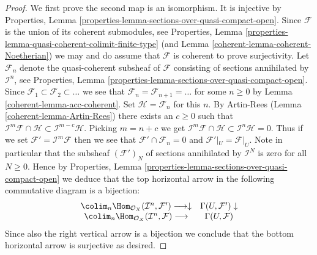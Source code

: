 \begin{proof}

We first prove the second map is an isomorphism. It is injective by
Properties, Lemma \ref{properties-lemma-sections-over-quasi-compact-open}.
Since $\mathcal{F}$ is the union of its coherent submodules, see
Properties, Lemma \ref{properties-lemma-quasi-coherent-colimit-finite-type}
(and Lemma \ref{coherent-lemma-coherent-Noetherian})
we may and do assume that $\mathcal{F}$ is coherent to prove surjectivity.
Let $\mathcal{F}_n$ denote the quasi-coherent subsheaf of $\mathcal{F}$
consisting of sections annihilated by $\mathcal{I}^n$,
see Properties, Lemma \ref{properties-lemma-sections-over-quasi-compact-open}.
Since $\mathcal{F}_1 \subset \mathcal{F}_2 \subset \ldots$ we see that
$\mathcal{F}_n = \mathcal{F}_{n + 1} = \ldots $ for some $n \geq 0$
by Lemma \ref{coherent-lemma-acc-coherent}. Set $\mathcal{H} = \mathcal{F}_n$
for this $n$. By Artin-Rees (Lemma \ref{coherent-lemma-Artin-Rees})
there exists an $c \geq 0$ such that
$\mathcal{I}^m\mathcal{F} \cap \mathcal{H}
\subset \mathcal{I}^{m - c}\mathcal{H}$. Picking $m = n + c$ we get
$\mathcal{I}^m\mathcal{F} \cap \mathcal{H} \subset \mathcal{I}^n\mathcal{H}
= 0$. Thus if we set $\mathcal{F}' = \mathcal{I}^m\mathcal{F}$ then we
see that $\mathcal{F}' \cap \mathcal{F}_n = 0$ and
$\mathcal{F}'|_U = \mathcal{F}|_U$. Note in particular that the subsheaf
$(\mathcal{F}')_N$ of sections annihilated by $\mathcal{I}^N$ is zero
for all $N \geq 0$. Hence by
Properties, Lemma \ref{properties-lemma-sections-over-quasi-compact-open}
we deduce that
the top horizontal arrow in the following commutative
diagram is a bijection:
$$
\begin{array}{cc}\colim_n \Hom_{\mathcal{O}_X}(
\mathcal{I}^n, \mathcal{F}')
\longrightarrow\downarrow & \Gamma(U, \mathcal{F}') \downarrow \\ \colim_n \Hom_{\mathcal{O}_X}(
\mathcal{I}^n, \mathcal{F})
\longrightarrow & \Gamma(U, \mathcal{F})\end{array}
$$
Since also the right vertical arrow is a bijection we conclude that
the bottom horizontal arrow is surjective as desired.


\end{proof}
